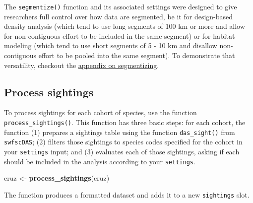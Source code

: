 \documentclass[
]{book}
\newenvironment{Shaded}{\begin{snugshade}}{\end{snugshade}}
\newcommand{\DecValTok}[1]{\textcolor[rgb]{0.00,0.00,0.81}{#1}}
\newcommand{\KeywordTok}[1]{\textcolor[rgb]{0.13,0.29,0.53}{\textbf{#1}}}
\newcommand{\NormalTok}[1]{#1}
\newcommand{\OperatorTok}[1]{\textcolor[rgb]{0.81,0.36,0.00}{\textbf{#1}}}
\newcommand{\StringTok}[1]{\textcolor[rgb]{0.31,0.60,0.02}{#1}}
\begin{document}
The \texttt{segmentize()} function and its associated settings were designed to give researchers full control over how data are segmented, be it for design-based density analysis (which tend to use long segments of 100 km or more and allow for non-contiguous effort to be included in the same segment) or for habitat modeling (which tend to use short segments of 5 - 10 km and disallow non-contiguous effort to be pooled into the same segment). To demonstrate that versatility, checkout the \protect\hyperlink{segmentizing}{appendix on segmentizing}.

\hypertarget{process-sightings}{%
\subsection*{Process sightings}\label{process-sightings}}

To process sightings for each cohort of species, use the function \texttt{process\_sightings()}. This function has three basic steps: for each cohort, the function (1) prepares a sightings table using the function \texttt{das\_sight()} from \texttt{swfscDAS}; (2) filters those sightings to species codes specified for the cohort in your \texttt{settings} input; and (3) evaluates each of those sightings, asking if each should be included in the analysis according to your \texttt{settings}.

\begin{Shaded}
\begin{Highlighting}[]
\NormalTok{cruz <-}\StringTok{ }\KeywordTok{process_sightings}\NormalTok{(cruz)}
\end{Highlighting}
\end{Shaded}

The function produces a formatted dataset and adds it to a new \texttt{sightings} slot.

\begin{Shaded}
\end{Shaded}
\end{document}

